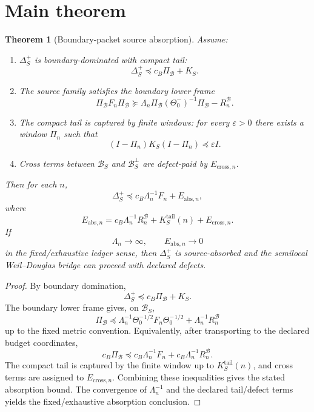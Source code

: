 \documentclass[11pt]{article}
\newtheorem{theorem}{Theorem}
\begin{document}
\section{Main theorem}

\begin{theorem}[Boundary-packet source absorption]
Assume:
\begin{enumerate}[label=(A\arabic*)]
\item $\Delta_S^+$ is boundary-dominated with compact tail:
\[
  \Delta_S^+\preceq c_B\Pi_{\mathcal B}+K_S.
\]
\item The source family satisfies the boundary lower frame
\[
  \Pi_{\mathcal B}F_n\Pi_{\mathcal B}
  \succeq
  \Lambda_n\Pi_{\mathcal B}(\Theta_0^-)^{-1}\Pi_{\mathcal B}-R_n^{\mathcal B}.
\]
\item The compact tail is captured by finite windows:
for every $\varepsilon>0$ there exists a window $\Pi_{n}$ such that
\[
  (I-\Pi_n)K_S(I-\Pi_n)\preceq \varepsilon I.
\]
\item Cross terms between $\mathcal B_S$ and $\mathcal B_S^\perp$ are defect-paid by $E_{\mathrm{cross},n}$.
\end{enumerate}
Then for each $n$,
\[
  \Delta_S^+
  \preceq
  c_B\Lambda_n^{-1}F_n
  +E_{\mathrm{abs},n},
\]
where
\[
  E_{\mathrm{abs},n}
  =
  c_B\Lambda_n^{-1}R_n^{\mathcal B}
  +K_S^{\mathrm{tail}}(n)
  +E_{\mathrm{cross},n}.
\]
If
\[
  \Lambda_n\to\infty,
  \qquad
  E_{\mathrm{abs},n}\to0
\]
in the fixed/exhaustive ledger sense, then $\Delta_S^+$ is source-absorbed and the semilocal Weil--Douglas bridge can proceed with declared defects.
\end{theorem}

\begin{proof}
By boundary domination,
\[
  \Delta_S^+\preceq c_B\Pi_{\mathcal B}+K_S.
\]
The boundary lower frame gives, on $\mathcal B_S$,
\[
  \Pi_{\mathcal B}
  \preceq
  \Lambda_n^{-1}\Theta_0^-{}^{1/2}F_n\Theta_0^-{}^{1/2}
  +\Lambda_n^{-1}R_n^{\mathcal B}
\]
up to the fixed metric convention.  Equivalently, after transporting to the declared budget coordinates,
\[
  c_B\Pi_{\mathcal B}
  \preceq
  c_B\Lambda_n^{-1}F_n+c_B\Lambda_n^{-1}R_n^{\mathcal B}.
\]
The compact tail is captured by the finite window up to $K_S^{\mathrm{tail}}(n)$, and cross terms are assigned to $E_{\mathrm{cross},n}$.  Combining these inequalities gives the stated absorption bound.  The convergence of $\Lambda_n^{-1}$ and the declared tail/defect terms yields the fixed/exhaustive absorption conclusion.
\end{proof}
\end{document}
